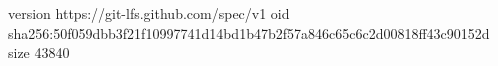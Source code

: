 version https://git-lfs.github.com/spec/v1
oid sha256:50f059dbb3f21f10997741d14bd1b47b2f57a846c65c6c2d00818ff43c90152d
size 43840
